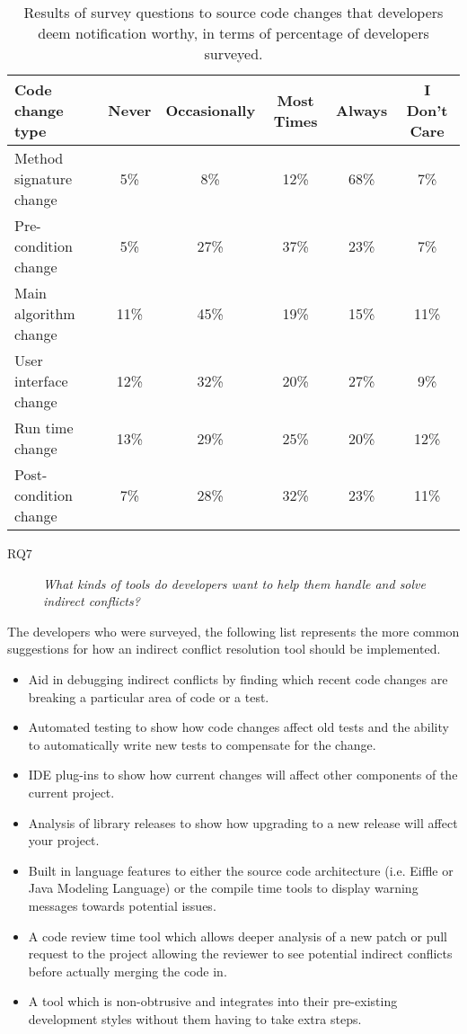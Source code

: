 \documentclass[conference]{IEEEtran}
\begin{document}
\begin{table*}[tb!]
\begin{center}
\begin{tabular}{| p{7cm} | c | c | c | c | c |}
\hline
Code change type &Never  & Occasionally & Most Times & Always & I Don't Care \\
\hline
\hline
Method signature change & 5\% & 8\% & 12\% & 68\% & 7\% \\ \hline
Pre-condition change & 5\% & 27\% & 37\% & 23\% & 7\% \\ \hline
Main algorithm change & 11\% & 45\% & 19\% & 15\% & 11\% \\ \hline
User interface change & 12\% & 32\% & 20\% & 27\% & 9\% \\ \hline
Run time change & 13\% & 29\% & 25\% & 20\% & 12\% \\ \hline
Post-condition change & 7\% & 28\% & 32\% & 23\% & 11\% \\ \hline
\end{tabular}
\end{center}
\caption{Results of survey questions to source code changes that developers deem notification worthy, in terms of percentage
of developers surveyed.\label{tab:pre}}
\end{table*}

\begin{description}
	\item[RQ7] \textit{What kinds of tools do developers want to help them handle and solve indirect conflicts?}
\end{description}

The developers who were surveyed, the following list represents the more common suggestions for how an indirect conflict
resolution tool should be implemented.

\begin{itemize}
	\item Aid in debugging indirect conflicts by finding which recent code changes are breaking a particular area of code or a test.
	\item Automated testing to show how code changes affect old tests and the ability to automatically write new tests to compensate for the change.
	\item IDE plug-ins to show how current changes will affect other components of the current project.
	\item Analysis of library releases to show how upgrading to a new release will affect your project.
	\item Built in language features to either the source code architecture (i.e. Eiffle or Java Modeling Language) or the compile time tools to display
				warning messages towards potential issues.
	\item A code review time tool which allows deeper analysis of a new patch or pull request to the project allowing the reviewer to see potential 
				indirect conflicts before actually merging the code in.
	\item A tool which is non-obtrusive and integrates into their pre-existing development styles without them having to take extra steps.
\end{itemize}
\end{document}
